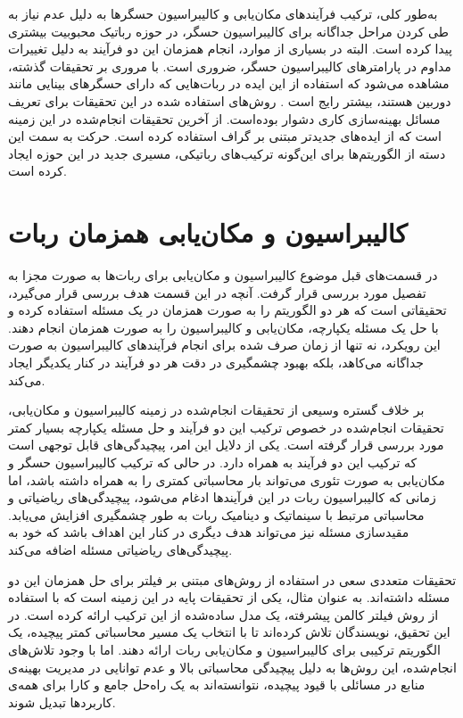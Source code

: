 به‌طور کلی، ترکیب فرآیندهای مکان‌یابی و کالیبراسیون حسگرها به دلیل عدم نیاز به طی کردن مراحل جداگانه برای کالیبراسیون حسگر، در حوزه رباتیک محبوبیت بیشتری پیدا کرده است. البته در بسیاری از موارد، انجام همزمان این دو فرآیند به دلیل تغییرات مداوم در پارامترهای کالیبراسیون حسگر، ضروری است. با مروری بر تحقیقات گذشته، مشاهده می‌شود که استفاده از این ایده در ربات‌هایی که دارای حسگرهای بینایی مانند دوربین هستند، بیشتر رایج است
\cite{zhou2014simultaneous, foxlin2002generalized}. 
روش‌های استفاده شده در این تحقیقات برای تعریف مسائل بهینه‌سازی کاری دشوار بوده‌است. 
\cite{reinke2019factor}
از آخرین تحقیقات انجام‌شده در این زمینه است که از ایده‌های جدیدتر مبتنی بر گراف استفاده کرده است. حرکت به سمت این دسته از الگوریتم‌ها برای این‌گونه ترکیب‌های رباتیکی، مسیری جدید در این حوزه ایجاد کرده است.
  
 
\section{کالیبراسیون و مکان‌یابی همزمان ربات}

در قسمت‌های قبل موضوع کالیبراسیون و مکان‌یابی برای ربات‌ها به صورت مجزا به تفصیل مورد بررسی قرار گرفت. آنچه در این قسمت هدف بررسی قرار می‌گیرد، تحقیقاتی است که هر دو الگوریتم را به صورت همزمان در یک مسئله استفاده کرده و با حل یک مسئله یکپارچه، مکان‌یابی و کالیبراسیون را به صورت همزمان انجام دهند. این رویکرد، نه تنها از زمان صرف شده برای انجام فرآیندهای کالیبراسیون به صورت جداگانه می‌کاهد، بلکه بهبود چشمگیری در دقت هر دو فرآیند در کنار یکدیگر ایجاد می‌کند.

بر خلاف گستره وسیعی از تحقیقات انجام‌شده در زمینه کالیبراسیون و مکان‌یابی، تحقیقات انجام‌شده در خصوص ترکیب این دو فرآیند و حل مسئله یکپارچه بسیار کمتر مورد بررسی قرار گرفته است. یکی از دلایل این امر، پیچیدگی‌های قابل توجهی است که ترکیب این دو فرآیند به همراه دارد. در حالی که ترکیب کالیبراسیون حسگر و مکان‌یابی به صورت تئوری می‌تواند بار محاسباتی کمتری را به همراه داشته باشد، اما زمانی که کالیبراسیون ربات در این فرآیندها ادغام می‌شود، پیچیدگی‌های ریاضیاتی و محاسباتی مرتبط با سینماتیک و دینامیک ربات به طور چشمگیری افزایش می‌یابد. مقیدسازی مسئله نیز می‌تواند هدف دیگری در کنار این اهداف باشد که خود به پیچیدگی‌های ریاضیاتی مسئله اضافه می‌کند.

تحقیقات متعددی سعی در استفاده از روش‌های مبتنی بر فیلتر برای حل همزمان این دو مسئله داشته‌اند. به عنوان مثال، \cite{kummerle2011simultaneous} یکی از تحقیقات پایه در این زمینه است که با استفاده از روش فیلتر کالمن پیشرفته، یک مدل ساده‌شده از این ترکیب ارائه کرده است. در این تحقیق، نویسندگان تلاش کرده‌اند تا با انتخاب یک مسیر محاسباتی کمتر پیچیده، یک الگوریتم ترکیبی برای کالیبراسیون و مکان‌یابی ربات ارائه دهند. اما با وجود تلاش‌های انجام‌شده، این روش‌ها به دلیل پیچیدگی محاسباتی بالا و عدم توانایی در مدیریت بهینه‌ی منابع در مسائلی با قیود پیچیده، نتوانسته‌اند به یک راه‌حل جامع و کارا برای همه‌ی کاربردها تبدیل شوند.


